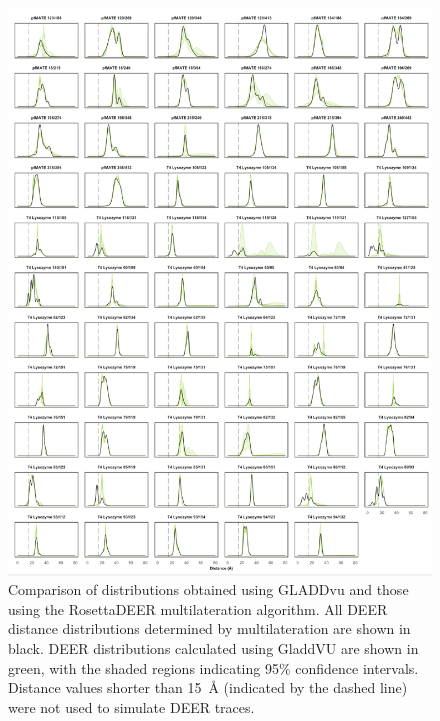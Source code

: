 \begin{figure}[h]
\centering
\includegraphics[width=6in]{Figures/multilateration_supp_gladdvu.pdf}
\caption[Comparison of distributions obtained using GLADDvu and those using the RosettaDEER multilateration algorithm.]{Comparison of distributions obtained using GLADDvu and those using the RosettaDEER multilateration algorithm. All DEER distance distributions determined by multilateration are shown in black. DEER distributions calculated using GladdVU are shown in green, with the shaded regions indicating 95\% confidence intervals. Distance values shorter than \SI{15}{\angstrom} (indicated by the dashed line) were not used to simulate DEER traces.}
\label{fig:multilateration_supp_gladdvu}
\end{figure}

